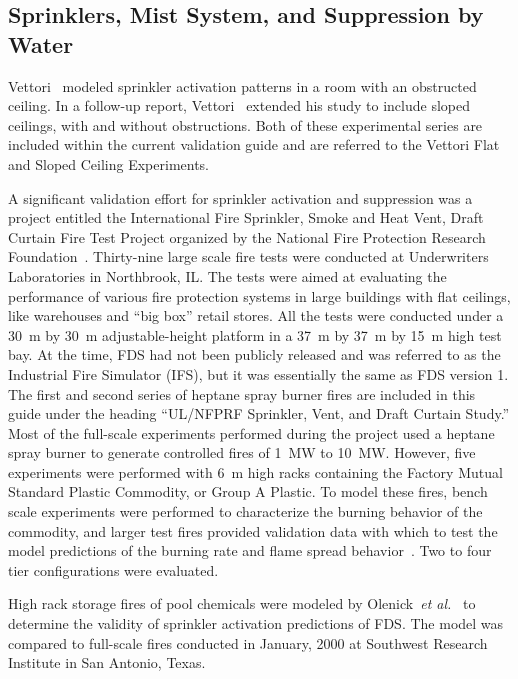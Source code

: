 \subsection{Sprinklers, Mist System, and Suppression by Water}

Vettori~\cite{Vettori:1} modeled sprinkler activation patterns in a room with an obstructed ceiling. In a follow-up report, Vettori~\cite{Vettori:2} extended his study to include sloped ceilings, with and without obstructions. Both of these experimental series are included within the current validation guide and are referred to the Vettori Flat and Sloped Ceiling Experiments.

A   significant  validation  effort   for  sprinkler   activation  and suppression was  a project entitled the  International Fire Sprinkler, Smoke and Heat Vent, Draft  Curtain Fire Test Project organized by the National Fire  Protection   Research  Foundation~\cite{McGrattan:5}. Thirty-nine large scale  fire  tests were  conducted at  Underwriters Laboratories in  Northbrook, IL.  The  tests were aimed  at evaluating the performance of various  fire protection systems in large buildings with  flat ceilings, like  warehouses and  ``big box''  retail stores. All the  tests were conducted  under a 30~m by  30~m adjustable-height platform in a 37~m by 37~m by 15~m high test bay. At the time, FDS had not been publicly released and  was referred to as the Industrial Fire Simulator (IFS), but it was essentially the same as FDS version 1. The first and second series of heptane spray burner fires are included in this guide under the heading ``UL/NFPRF Sprinkler, Vent, and Draft Curtain Study.'' Most of the full-scale experiments performed during the project used a heptane  spray  burner  to   generate  controlled  fires  of  1~MW  to 10~MW. However, five  experiments  were performed  with  6~m high  racks containing the  Factory Mutual Standard Plastic Commodity,  or Group A Plastic. To model these  fires, bench scale experiments were performed to characterize the burning behavior of the commodity, and larger test fires  provided validation  data  with  which to test the  model predictions of the burning rate and flame spread behavior~\cite{Hamins:1,Hamins:IAFSS2002}. Two to four tier configurations  were  evaluated.  

High rack storage fires of pool chemicals were modeled by Olenick~{\em et  al.}~\cite{Olenick:1}  to  determine  the  validity  of  sprinkler activation predictions  of FDS.  The model was  compared to full-scale fires conducted  in January, 2000  at Southwest Research  Institute in San Antonio,  Texas.

